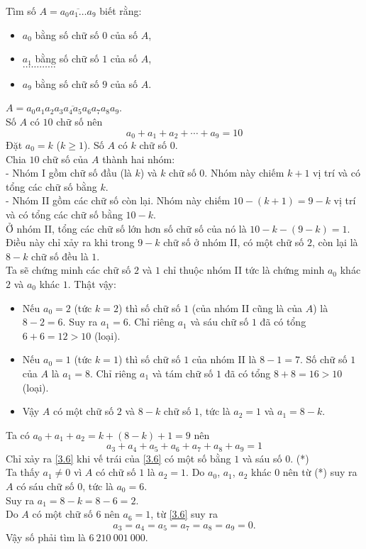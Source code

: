 \begin{bt}\label{136}
 Tìm số $A = \overline{a_0 a_1 \ldots a_9}$ biết rằng:
 \begin{itemize}
  \item[ ] $a_0$ bằng số chữ số $0$ của số $A$,
  \item[ ] $a_1$ bằng số chữ số $1$ của số $A$,\\
  $\ldots \ldots \ldots \ldots$
  \item[ ] $a_9$ bằng số chữ số $9$ của số $A$.
 \end{itemize}
 \loigiai
  {
  $A = \overline{a_0 a_1 a_2 a_3 a_4 a_5 a_6 a_7 a_8 a_9}$.\\
  Số $A$ có $10$ chữ số nên
  \begin{equation}
   a_0 + a_1 + a_2 + \cdots + a_9 = 10 \label{3.5}
  \end{equation}
  Đặt $a_0 = k$ ($k \geq 1$). Số $A$ có $k$ chữ số $0$.\\
  Chia $10$ chữ số của $A$ thành hai nhóm:\\
  - Nhóm I gồm chữ số đầu (là $k$) và $k$ chữ số $0$. Nhóm này chiếm $k + 1$ vị trí và có tổng các chữ số bằng $k$.\\
  - Nhóm II gồm các chữ số còn lại. Nhóm này chiếm $10 - (k+1) = 9 - k$ vị trí và có tổng các chữ số bằng $10 - k$.\\
  Ở nhóm II, tổng các chữ số lớn hơn số chữ số của nó là $10 - k - (9 - k) = 1$. Điều này chỉ xảy ra khi  trong $9 - k$ chữ số ở nhóm II, có một chữ số $2$, còn lại là $8 - k$ chữ số đều là $1$.\\
  Ta sẽ chứng minh các chữ số $2$ và $1$ chỉ thuộc nhóm II tức là chứng minh $a_0$ khác $2$ và $a_0$ khác $1$. Thật vậy:
  \begin{itemize}
   \item Nếu $a_0 = 2$ (tức $k = 2$) thì số chữ số $1$ (của nhóm II cũng là của $A$) là $8 - 2 = 6$. Suy ra $a_1 = 6$. Chỉ riêng $a_1$ và sáu chữ số $1$ đã có tổng $6 + 6 = 12 > 10$ (loại).
   \item Nếu $a_0 = 1$ (tức $k = 1$) thì số chữ số $1$ của nhóm II là $8 - 1 = 7$. Số chữ số $1$ của $A$ là $a_1 = 8$. Chỉ riêng $a_1$ và tám chữ số $1$ đã có tổng $8 + 8 = 16 > 10$ (loại).
   \item Vậy $A$ có một chữ số $2$ và $8-k$ chữ số $1$, tức là $a_2 = 1$ và $a_1 = 8 - k$.
  \end{itemize}
  Ta có $a_0 + a_1 + a_2 = k + (8 - k) + 1 = 9$ nên
  \begin{equation}
   a_3 + a_4 + a_5 + a_6 + a_7 + a_8 + a_9 = 1 \label{3.6}
  \end{equation}
  Chỉ xảy ra \eqref{3.6} khi vế trái của \eqref{3.6} có một số bằng $1$ và sáu số $0$. \hfill (*)\\
  Ta thấy $a_1 \neq 0$ vì $A$ có chữ số $1$ là $a_2 = 1$. Do $a_0$, $a_1$, $a_2$ khác $0$  nên từ (*) suy ra $A$ có sáu chữ số $0$, tức là $a_0 = 6$.\\
  Suy ra $a_1 = 8 - k = 8 - 6 = 2$.\\
  Do $A$ có một chữ số $6$ nên $a_6 = 1$, từ \eqref{3.6} suy ra
  $$a_3 = a_4 = a_5 = a_7 = a_8 = a_9 = 0.$$
  Vậy số phải tìm là $6 \ 210 \ 001 \ 000$.
  }
\end{bt}


